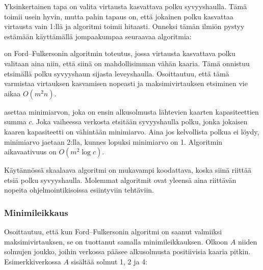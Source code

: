 Yksinkertainen tapa on valita virtausta kasvattava
polku syvyyshaulla.
Tämä toimii usein hyvin, mutta pahin tapaus on,
että jokainen polku
kasvattaa virtausta vain 1:llä ja algoritmi toimii hitaasti.
Onneksi tämän ilmiön pystyy estämään käyttämällä
jompaakumpaa seuraavaa algoritmia:


 on
Ford–Fulkersonin algoritmin toteutus,
jossa virtausta kasvattava polku valitaan
aina niin, että siinä on mahdollisimman vähän kaaria.
Tämä onnistuu etsimällä polku syvyyshaun
sijasta leveyshaulla.
Osoittautuu, että tämä varmistaa virtauksen
kasvamisen nopeasti ja
maksimivirtauksen etsiminen vie aikaa $O(m^2 n)$.


asettaa minimiarvon, joka on ensin alkusolmusta
lähtevien kaarten kapasiteettien summa $c$.
Joka vaiheessa verkosta etsitään
syvyyshaulla polku, jonka jokaisen kaaren kapasiteetti
on vähintään minimiarvo.
Aina jos kelvollista polkua ei löydy,
minimiarvo jaetaan 2:lla,
kunnes lopuksi minimiarvo on 1.
Algoritmin aikavaativuus on $O(m^2 \log c)$.

Käytännössä skaalaava algoritmi on mukavampi koodattava,
koska siinä riittää etsiä polku syvyyshaulla.
Molemmat algoritmit ovat yleensä aina riittävän
nopeita ohjelmointikisoissa esiintyviin tehtäviin.

\subsubsection{Minimileikkaus}


Osoittautuu, että kun Ford–Fulkersonin algoritmi on saanut valmiiksi
maksimivirtauksen, se on tuottanut samalla minimileikkauksen.
Olkoon $A$ niiden solmujen joukko,
joihin verkossa pääsee
alkusolmusta positiivisia kaaria pitkin.
Esimerkkiverkossa $A$ sisältää solmut 1, 2 ja 4:

